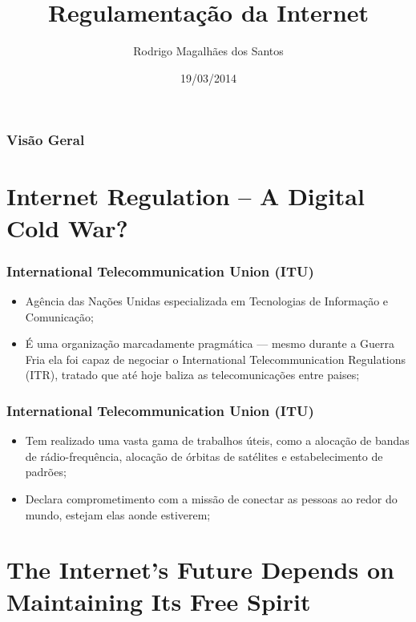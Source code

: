 \documentclass{beamer}
\title[Regulamentação da Internet]{Regulamentação da Internet} %
\author{Rodrigo Magalhães dos Santos} %
\institute[IPT] %
{
Instituto de Pesquisas Tecnológicas \\ Universidade de São Paulo \\ %
\medskip
\textit{rmagalhaes85@gmail.com} %
}
\date{19/03/2014}
\begin{document}
\begin{frame}
\titlepage %
\end{frame}

\begin{frame}
\frametitle{Visão Geral}
\tableofcontents 
\end{frame}


\section{Internet Regulation -- A Digital Cold War?} 

\begin{frame}
\frametitle{International Telecommunication Union (ITU)}
\begin{itemize}
\item Agência das Nações Unidas especializada em Tecnologias de Informação e Comunicação;
\item É uma organização marcadamente pragmática --- mesmo durante a Guerra Fria ela foi capaz de negociar o International Telecommunication Regulations (ITR), tratado que até hoje baliza as telecomunicações entre paises;
\end{itemize}
\end{frame}


\begin{frame}
\frametitle{International Telecommunication Union (ITU)}
\begin{itemize}
\item Tem realizado uma vasta gama de trabalhos úteis, como a alocação  de bandas de rádio-frequência, alocação de órbitas de satélites e estabelecimento de padrões;
\item Declara comprometimento com a missão de conectar as pessoas ao redor do mundo, estejam elas aonde estiverem;
\end{itemize}
\end{frame}


\section{The Internet's Future Depends on Maintaining Its Free Spirit}
\end{document}
